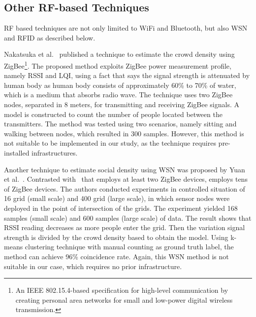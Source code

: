 	

	








	\subsection{Other RF-based Techniques} %
	\label{sub:other_rf_techniques}
	\ac{RF} based techniques are not only limited to WiFi and Bluetooth, but also \ac{WSN} and \ac{RFID} as described below.

	Nakatsuka et al.~\cite{thesis042} published a technique to estimate the crowd density using ZigBee\footnote{An IEEE 802.15.4-based specification for high-level communication by creating personal area networks for small and low-power digital wireless transmission.}. The proposed method exploits ZigBee power measurement profile, namely \ac{RSSI} and \ac{LQI}, using a fact that says the signal strength is attenuated by human body as human body consists of approximately 60\% to 70\% of water, which is a medium that absorbs radio wave. The technique uses two ZigBee nodes, separated in 8 meters, for transmitting and receiving ZigBee signals. A model is constructed to count the number of people located between the transmitters. The method was tested using two scenarios, namely sitting and walking between nodes, which resulted in 300 samples. However, this method is not suitable to be implemented in our study, as the technique requires pre-installed infrastructures.
	
	Another technique to estimate social density using \ac{WSN} was proposed by Yuan et al.~\cite{thesis043}. Contrasted with~\cite{thesis042} that employs at least two ZigBee devices, \cite{thesis043} employs tens of ZigBee devices.
	The authors conducted experiments in controlled situation of 16 grid (small scale) and 400 grid (large scale), in which sensor nodes were deployed in the point of intersection of the grids. The experiment yielded 168 samples (small scale) and 600 samples (large scale) of data. The result shows that \ac{RSSI} reading decreases as more people enter the grid. Then the variation signal strength is divided by the crowd density based to obtain the model. Using k-means clustering technique with manual counting as ground truth label, the method can achieve 96\% coincidence rate. Again, this WSN method is not suitable in our case, which requires no prior infrastructure.


